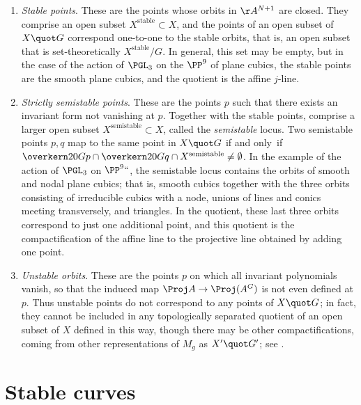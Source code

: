 \begin{enumerate}
\item  \emph{Stable points}. These are the points whose orbits in
%
$\AA^{N+1}$ are closed. They comprise an open subset 
$X^{\mathrm{stable}} \subset X$, and the points of an open subset of
$X\quot G$ correspond one-to-one to the stable orbits, that is, an open subset
that is 
set-theoretically
$X^{\mathrm{stable}}/G$. In general, this
set may be empty, but in the case of the action of 
$\PGL_3$ 
on the
%
$\PP^9$ of 
plane cubics,
%
the stable points are the smooth plane
cubics, and the quotient is the affine $j$-line. 

%
\item \emph{Strictly semistable points}. 
%
%
These are the points $p$ such that there exists an invariant form not
vanishing at $p$.  Together with the stable points, comprise a larger
open subset $X^{\mathrm{{semistable}}} \subset X$, called the
\emph{semistable} locus. Two  semistable points $p,q$ map to the same
point in $X\quot G$ if and only~if $\overkern20{Gp}\cap
\overkern20{Gq}\cap X^{\mathrm{{semistable}}} \neq \emptyset$. In the
example of the action of $\PGL_3$ on  $\PP^9` `$, the semistable
locus contains  the orbits of smooth and nodal plane cubics; that is,
smooth cubics together with the three orbits consisting of irreducible
cubics with a node, unions of lines and conics meeting transversely,
and triangles. In the quotient, these last three orbits correspond to
just one additional point, and this quotient is the 
compactification of the affine line
%
to the projective line obtained by adding one point.

\item  \emph{Unstable orbits}. These are the 
%
points $p$ on which all invariant polynomials vanish, so that the induced map
$\Proj A \to \Proj (A^G)$ is not even defined at $p$. Thus unstable
points do not correspond to any points of $X\quot G$; in fact, they
cannot be included in any topologically separated quotient of an open
subset of $X$ defined in this way, though there may be other
compactifications, coming from
other representations of $M_g$ as $X'\quot  G'$; see \cite{MR3044128}.
\end{enumerate}

\section{Stable curves}

